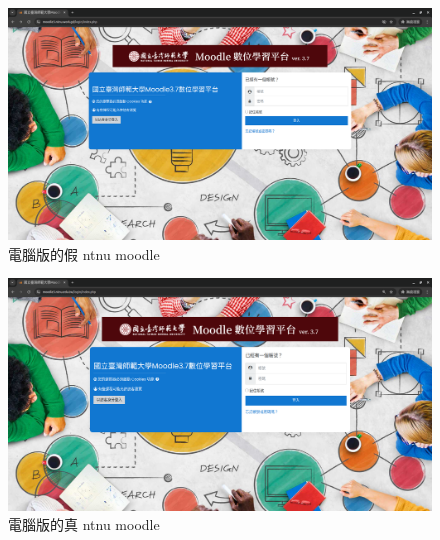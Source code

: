 \documentclass[a4paper,12pt]{article}
\begin{document}
\begin{figure}[ht!]
    \centering
    \includegraphics[width=1\textwidth]{pc_fake.png}
    \caption{電腦版的假 ntnu moodle}
    \label{fig:fake_site}
\end{figure}

\begin{figure}[ht!]
    \centering
    \includegraphics[width=1\textwidth]{pc_real.png}
    \caption{電腦版的真 ntnu moodle }
    \label{fig:real_site}
\end{figure}
\end{document}
